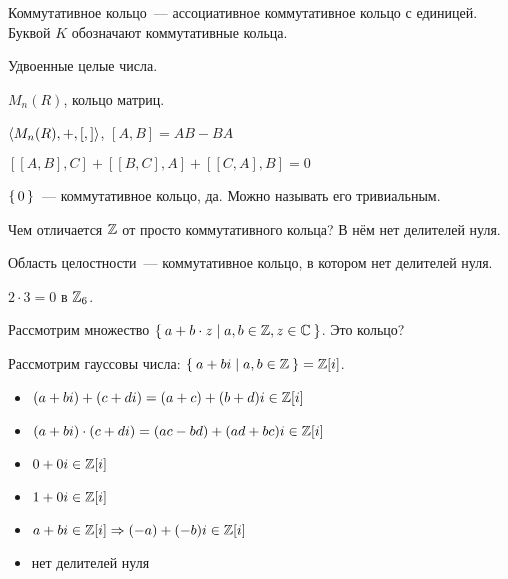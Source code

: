 \begin{define*}
  Коммутативное кольцо~--- ассоциативное коммутативное кольцо с единицей. Буквой $K$ обозначают коммутативные кольца.
\end{define*}

\begin{example}
  Удвоенные целые числа.
\end{example}

\begin{example}
  $M_n(R)$, кольцо матриц.  
\end{example}

\begin{example}
  $\braket{M_n(R), +, [,]}$, $[A,B] = AB-BA$
  
  $[[A,B],C] + [[B,C],A] + [[C,A],B] = 0$
\end{example}

\begin{example}
  $\set{0}$~--- коммутативное кольцо, да. Можно называть его тривиальным.
\end{example}

Чем отличается $\mathbb{Z}$ от просто коммутативного кольца? В нём нет делителей нуля.

\begin{define*}
  Область целостности~--- коммутативное кольцо, в котором нет делителей нуля.
\end{define*}

\begin{example}
    $2\cdot3 = 0$ в $\mathbb{Z}_6$.
\end{example}

Рассмотрим множество $\Set{a+b\cdot z | a,b \in \mathbb{Z}, z \in \mathbb{C}}$. Это кольцо?

Рассмотрим гауссовы числа: $\Set{a+bi | a,b \in \mathbb{Z}} = \mathbb{Z}[i]$.

\begin{itemize}
    \item $(a+bi)+(c+di) = (a+c)+ (b+d)i \in \mathbb{Z}[i]$
    \item $(a+bi)\cdot(c+di) = (ac-bd) + (ad+bc)i \in \mathbb{Z}[i]$
    \item $0 + 0i \in \mathbb{Z}[i]$
    \item $1 + 0i \in \mathbb{Z}[i]$
    \item $a+bi \in \mathbb{Z}[i] \Rightarrow (-a) + (-b)i \in \mathbb{Z}[i]$
    \item нет делителей нуля
\end{itemize}

